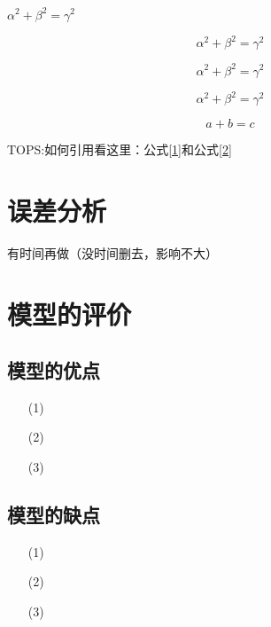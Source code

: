 \documentclass[withoutpreface,bwprint]{cumcmthesis} %
\begin{document}
$\alpha^2+\beta^2=\gamma^2$

$$ \alpha^2+\beta^2=\gamma^2$$

\begin{equation}\nonumber
	\alpha^2+\beta^2=\gamma^2
\end{equation}

\begin{equation}
	\alpha^2+\beta^2=\gamma^2 \label{1}
\end{equation}

\begin{equation}
	a+b=c \label{2}
\end{equation}

TOPS:如何引用看这里：公式\eqref{1}和公式\eqref{2}
\newpage

\section{误差分析}

有时间再做（没时间删去，影响不大）

\section{模型的评价}
	
\subsection{模型的优点}

\begin{itemize}
	
\item[(1)] 

\item[(2)] 

\item[(3)] 

\end{itemize}	
	
\subsection{模型的缺点}
	
\begin{itemize}
	
	\item[(1)] 
	
	\item[(2)] 
	
	\item[(3)] 
	
\end{itemize}	
\end{document}
